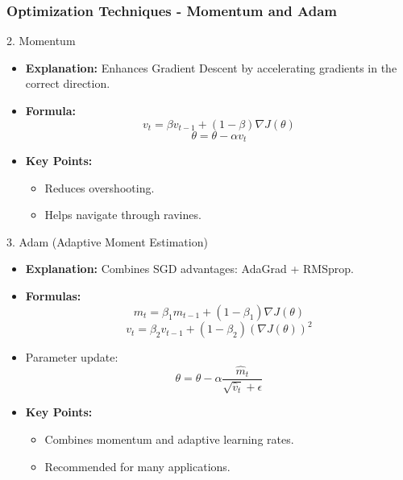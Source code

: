 \documentclass[aspectratio=169]{beamer}
\begin{document}
\begin{frame}[fragile]
    \frametitle{Optimization Techniques - Momentum and Adam}
    \begin{block}{2. Momentum}
        \begin{itemize}
            \item \textbf{Explanation:} Enhances Gradient Descent by accelerating gradients in the correct direction.
            \item \textbf{Formula:}
            \begin{equation}
                v_t = \beta v_{t-1} + (1 - \beta) \nabla J(\theta)
            \end{equation}
            \begin{equation}
                \theta = \theta - \alpha v_t
            \end{equation}
            \item \textbf{Key Points:}
            \begin{itemize}
                \item Reduces overshooting.
                \item Helps navigate through ravines.
            \end{itemize}
        \end{itemize}
    \end{block}
    
    \begin{block}{3. Adam (Adaptive Moment Estimation)}
        \begin{itemize}
            \item \textbf{Explanation:} Combines SGD advantages: AdaGrad + RMSprop.
            \item \textbf{Formulas:}
            \begin{equation}
                m_t = \beta_1 m_{t-1} + (1 - \beta_1) \nabla J(\theta)
            \end{equation}
            \begin{equation}
                v_t = \beta_2 v_{t-1} + (1 - \beta_2)(\nabla J(\theta))^2
            \end{equation}
            \item Parameter update:
            \begin{equation}
                \theta = \theta - \alpha \frac{\hat{m}_t}{\sqrt{\hat{v}_t} + \epsilon}
            \end{equation}
            \item \textbf{Key Points:}
            \begin{itemize}
                \item Combines momentum and adaptive learning rates.
                \item Recommended for many applications.
            \end{itemize}
        \end{itemize}
    \end{block}
\end{frame}
\end{document}
